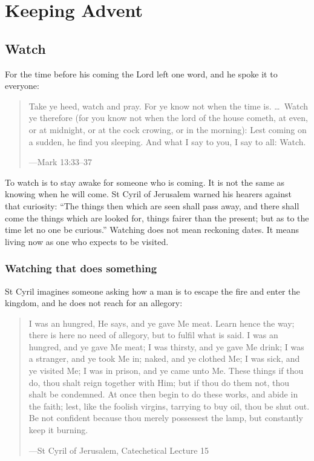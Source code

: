 \section{Keeping Advent}

\subsection{Watch}\label{sec:watch}

For the time before his coming the Lord left one word, and he spoke it to
everyone:

\begin{quote}
Take ye heed, watch and pray. For ye know not when the time is. \dots\ Watch ye
therefore (for you know not when the lord of the house cometh, at even, or at
midnight, or at the cock crowing, or in the morning): Lest coming on a sudden,
he find you sleeping. And what I say to you, I say to all: Watch.\par
{\smallskip\noindent\small ---Mark 13:33--37\par}
\end{quote}

To watch is to stay awake for someone who is coming. It is not the same as
knowing when he will come. St Cyril of Jerusalem warned his hearers against
that curiosity: ``The things then which are seen
shall pass away, and there shall come the things which are looked for, things
fairer than the present; but as to the time let no one be curious.'' Watching
does not mean reckoning dates. It means living now as one who expects to be
visited.

\subsubsection*{Watching that does something}

St Cyril imagines someone asking how a man is to escape the fire and enter the
kingdom, and he does not reach for an allegory:

\begin{quote}
I was an hungred, He says, and ye gave Me meat. Learn hence the way; there is
here no need of allegory, but to fulfil what is said. I was an hungred, and ye
gave Me meat; I was thirsty, and ye gave Me drink; I was a stranger, and ye took
Me in; naked, and ye clothed Me; I was sick, and ye visited Me; I was in prison,
and ye came unto Me. These things if thou do, thou shalt reign together with
Him; but if thou do them not, thou shalt be condemned. At once then begin to do
these works, and abide in the faith; lest, like the foolish virgins, tarrying
to buy oil, thou be shut out. Be not confident because thou merely possessest
the lamp, but constantly keep it burning.\par
{\smallskip\noindent\small ---St Cyril of Jerusalem, Catechetical Lecture 15\par}
\end{quote}

